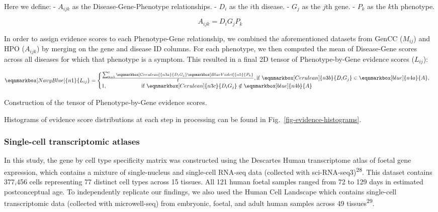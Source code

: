 \documentclass[
]{article}
\begin{document}
Here we define: - \(A_{ijk}\) as the Disease-Gene-Phenotype
relationships. - \(D_i\) as the \(i\)th disease. - \(G_j\) as the
\(j\)th gene. - \(P_k\) as the \(k\)th phenotype.

\[
A_{ijk} = D_i G_j P_k
\]

In order to assign evidence scores to each Phenotype-Gene relationship,
we combined the aforementioned datasets from GenCC (\(M_{ij}\)) and HPO
(\(A_{ijk}\)) by merging on the gene and disease ID columns. For each
phenotype, we then computed the mean of Disease-Gene scores across all
diseases for which that phenotype is a symptom. This resulted in a final
2D tensor of Phenotype-by-Gene evidence scores (\(L_{ij}\)):

\hfill\break
\hfill\break

$$
 \eqnmarkbox[NavyBlue]{n1}{ L_{ij} } = 
 \begin{cases}
  \frac{\sum_{k=1}^{\text{f}} 
    \eqnmarkbox[Cerulean]{n3a}{D_i G_j} 
    \eqnmarkbox[BlueViolet]{n5}{P_k} 
    }{\text{f}}, 
  \text{if } \eqnmarkbox[Cerulean]{n3b}{D_i G_j} 
    \in \eqnmarkbox[blue]{n4a}{A},
  \\
  1, \hspace{2.2cm}
  \text{if } \eqnmarkbox[Cerulean]{n3c}{D_i G_j} 
    \notin\eqnmarkbox[blue]{n4b}{A}
 \end{cases}
$$

\hfill\break

Construction of the tensor of Phenotype-by-Gene evidence scores.

\hfill\break

Histograms of evidence score distributions at each step in processing
can be found in Fig.~\ref{fig-evidence-histograms}.

\subsubsection{Single-cell transcriptomic
atlases}\label{single-cell-transcriptomic-atlases}

In this study, the gene by cell type specificity matrix was constructed
using the Descartes Human transcriptome atlas of foetal gene expression,
which contains a mixture of single-nucleus and single-cell RNA-seq data
(collected with sci-RNA-seq3)\textsuperscript{28}. This dataset contains
377,456 cells representing 77 distinct cell types across 15 tissues. All
121 human foetal samples ranged from 72 to 129 days in estimated
postconceptual age. To independently replicate our findings, we also
used the Human Cell Landscape which contains single-cell transcriptomic
data (collected with microwell-seq) from embryonic, foetal, and adult
human samples across 49 tissues\textsuperscript{29}.
\end{document}
